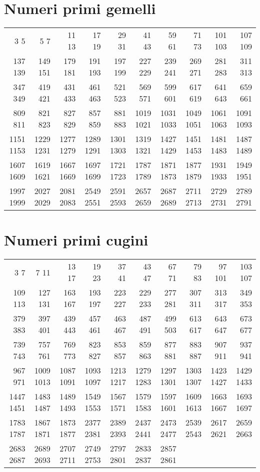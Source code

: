 \section{Numeri primi gemelli}
\label{sec:TabellaNumeriPrimigemelli}
\begin{center}
 \footnotesize
 \begin{tabular}{*{10}{r}}
 \toprule 
3 5&5 7&11 13&17 19&29 31&41 43&59 61&71 73&101 103&107 109\\
137 139&149 151&179 181&191 193&197 199&227 229&239 241&269 271&281 283&311 313\\
347 349&419 421&431 433&461 463&521 523&569 571&599 601&617 619&641 643&659 661\\
809 811&821 823&827 829&857 859&881 883&1019 1021&1031 1033&1049 1051&1061 1063&1091 1093\\
1151 1153&1229 1231&1277 1279&1289 1291&1301 1303&1319 1321&1427 1429&1451 1453&1481 1483&1487 1489\\
1607 1609&1619 1621&1667 1669&1697 1699&1721 1723&1787 1789&1871 1873&1877 1879&1931 1933&1949 1951\\
1997 1999&2027 2029&2081 2083&2549 2551&2591 2593&2657 2659&2687 2689&2711 2713&2729 2731&2789 2791\\
 \bottomrule
 \end{tabular}
\end{center}
\section{Numeri primi cugini}
\begin{center}
 \footnotesize
 \begin{tabular}{*{10}{r}}
  \toprule 
3 7&7 11&13 17&19 23&37 41&43 47&67 71&79 83&97 101&103 107\\
109 113&127 131&163 167&193 197&223 227&229 233&277 281&307 311&313 317&349 353\\
379 383&397 401&439 443&457 461&463 467&487 491&499 503&613 617&643 647&673 677\\
739 743&757 761&769 773&823 827&853 857&859 863&877 881&883 887&907 911&937 941\\
967 971&1009 1013&1087 1091&1093 1097&1213 1217&1279 1283&1297 1301&1303 1307&1423 1427&1429 1433\\
1447 1451&1483 1487&1489 1493&1549 1553&1567 1571&1579 1583&1597 1601&1609 1613&1663 1667&1693 1697\\
1783 1787&1867 1871&1873 1877&2377 2381&2389 2393&2437 2441&2473 2477&2539 2543&2617 2621&2659 2663\\
2683 2687&2689 2693&2707 2711&2749 2753&2797 2801&2833 2837&2857 2861\\
  \bottomrule
 \end{tabular}
\end{center}

